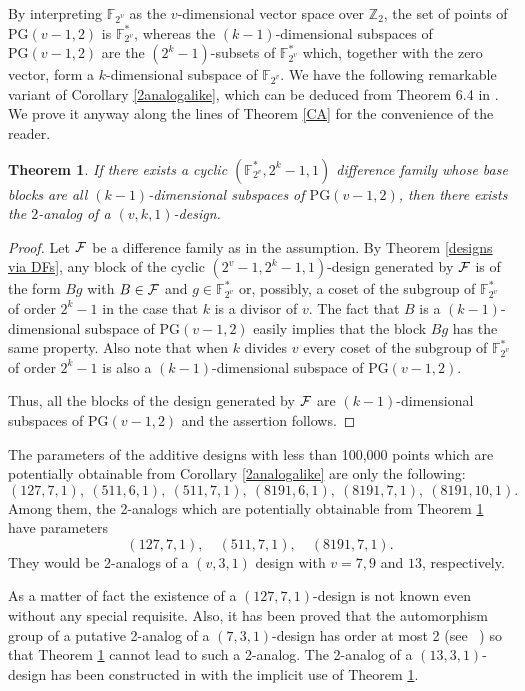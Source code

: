 \documentclass[a4paper, 11pt]{article}
\newtheorem{theorem}{Theorem}[section]
\theoremstyle{definition}
\theoremstyle{definition}
\theoremstyle{definition}
\newcommand{\Z}{\mathbb{Z}}
\newcommand{\F}{\mathbb{F}}
\numberwithin{equation}{section}
\begin{document}
By interpreting $\F_{2^v}$ as the $v$-dimensional vector space over $\Z_2$, 
 the set of points of $\mathrm{PG}(v-1,2)$ is $\F_{2^v}^*$, whereas the $(k-1)$-dimensional
subspaces of $\mathrm{PG}(v-1,2)$ are the $(2^k-1)$-subsets of $\F_{2^v}^*$ 
which, together with the zero vector, form a $k$-dimensional subspace of $\F_{2^v}$.
We have the following remarkable variant of Corollary \ref{2analogalike}, which can be deduced
from Theorem 6.4 in \cite{BNW}. We prove it anyway along the lines of Theorem \ref{CA}
for the convenience of the reader.

\begin{theorem}\label{2analog}
If there exists a cyclic $(\F_{2^v}^*,2^k-1,1)$ difference family whose base blocks are all 
$(k-1)$-dimensional subspaces of $\mathrm{PG}(v-1,2)$, then there exists the $2$-analog of a $(v,k,1)$-design.
\end{theorem}
\begin{proof}
Let $\cal F$ be a difference family as in the assumption. 
By Theorem \ref{designs via DFs}, any block of the cyclic $(2^v-1,2^k-1,1)$-design generated by $\cal F$ is of the form
$Bg$ with $B\in{\cal F}$ and $g\in \F_{2^v}^*$ or, possibly, a coset of the subgroup of $\F_{2^v}^*$ of order 
$2^k-1$ in the case that $k$ is a divisor of $v$. 
The fact that $B$ is a $(k-1)$-dimensional subspace of $\mathrm{PG}(v-1,2)$
easily implies that the block $Bg$ has the same property. Also note that when $k$ divides $v$
every coset of the subgroup of $\F_{2^v}^*$ of order $2^k-1$ is also a 
$(k-1)$-dimensional subspace of $\mathrm{PG}(v-1,2)$.

Thus, all the blocks of the design generated by $\cal F$ are $(k-1)$-dimensional subspaces of $\mathrm{PG}(v-1,2)$ and the assertion follows.
\end{proof}



The parameters of the additive designs with less than 100,000 points which are potentially obtainable 
from Corollary \ref{2analogalike} are only the following:
$$(127,7,1), \ (511,6,1), \ (511,7,1), \ (8191,6,1), \ (8191,7,1), \ (8191,10,1).$$
Among them, the 2-analogs which are potentially obtainable 
from Theorem \ref{2analog} have parameters
$$(127,7,1), \quad (511,7,1), \quad (8191,7,1).$$
They would be 2-analogs of a $(v,3,1)$ design with $v=7, 9$ and $13$, respectively.


As a matter of fact the existence of a $(127,7,1)$-design is not known even without any special requisite. 
Also, it has been proved that the automorphism group of a putative 2-analog of a $(7,3,1)$-design has 
order at most 2 (see ~\cite{BKN15, KKW16}) so that Theorem \ref{2analog} cannot lead to such a 2-analog.
The 2-analog of a $(13,3,1)$-design has been constructed in \cite{BEOVW}
with the implicit use of Theorem \ref{2analog}.
\end{document}
